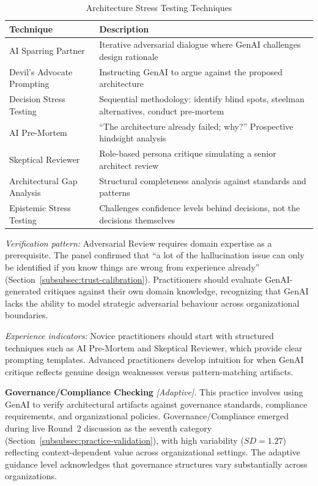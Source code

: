 \begin{table}[!ht]
    \centering
    \caption{Architecture Stress Testing Techniques}\label{tab:stress-testing}
    \begin{tabular}{|p{4cm}|p{9cm}|}
        \hline
        \textbf{Technique} & \textbf{Description} \\
        \hline
        AI Sparring Partner & Iterative adversarial dialogue where GenAI challenges design rationale \\
        \hline
        Devil's Advocate Prompting & Instructing GenAI to argue against the proposed architecture \\
        \hline
        Decision Stress Testing & Sequential methodology: identify blind spots, steelman alternatives, conduct pre-mortem \\
        \hline
        AI Pre-Mortem & ``The architecture already failed; why?'' Prospective hindsight analysis \\
        \hline
        Skeptical Reviewer & Role-based persona critique simulating a senior architect review \\
        \hline
        Architectural Gap Analysis & Structural completeness analysis against standards and patterns \\
        \hline
        Epistemic Stress Testing & Challenges confidence levels behind decisions, not the decisions themselves \\
        \hline
    \end{tabular}
\end{table}

\textit{Verification pattern:} Adversarial Review requires domain expertise as a
prerequisite. The panel confirmed that ``a lot of the hallucination issue can
only be identified if you know things are wrong from experience already''
(Section~\ref{subsubsec:trust-calibration}). Practitioners should evaluate
GenAI-generated critiques against their own domain knowledge, recognizing that
GenAI lacks the ability to model strategic adversarial behaviour across
organizational boundaries.

\textit{Experience indicators:} Novice practitioners should start with
structured techniques such as AI Pre-Mortem and Skeptical Reviewer, which
provide clear prompting templates. Advanced practitioners develop intuition for
when GenAI critique reflects genuine design weaknesses versus pattern-matching
artifacts.

\textbf{Governance/Compliance Checking} \textit{[Adaptive].}
This practice involves using GenAI to verify architectural artifacts against
governance standards, compliance requirements, and organizational policies.
Governance/Compliance emerged during live Round~2 discussion as the seventh
category (Section~\ref{subsubsec:practice-validation}), with high variability
($SD = 1.27$) reflecting context-dependent value across organizational settings.
The adaptive guidance level acknowledges that governance structures vary
substantially across organizations.

